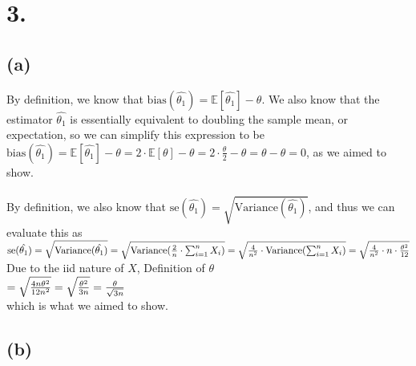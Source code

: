 \documentclass{article}
\begin{document}
\section*{3.}
{\Large

\subsection*{(a)}

By definition, we know that $\text{bias}(\hat{\theta_1}) = \mathbb{E}[\hat{\theta_1}] - \theta$. We also know that the estimator $\hat{\theta_1}$ is essentially equivalent to doubling the sample mean, or expectation, so we can simplify this expression to be \\
$\text{bias}(\hat{\theta_1}) = \mathbb{E}[\hat{\theta_1}] - \theta = 2 \cdot \mathbb{E}[\theta] - \theta = 2 \cdot \frac{\theta}{2} - \theta = \theta - \theta = 0$, as we aimed to show. \\ \\
By definition, we also know that $\text{se}(\hat{\theta_1}) = \sqrt{\text{Variance}(\hat{\theta_1})}$, and thus we can evaluate this as \\ 
$\text{se}(\hat{\theta_1}) = \sqrt{\text{Variance}(\hat{\theta_1})} \\
= \sqrt{\text{Variance}(\frac{2}{n} \cdot \sum_{i=1}^{n} X_i)} \\
= \sqrt{\frac{4}{n^2} \cdot \text{Variance}(\sum_{i=1}^{n} X_i)} \\
= \sqrt{\frac{4}{n^2} \cdot n \cdot \frac{\theta^2}{12}} $ \hfill Due to the iid nature of $X$, Definition of $\theta$ \\ 
$= \sqrt{\frac{4n\theta^2}{12n^2}} \\
= \sqrt{\frac{\theta^2}{3n}} \\
= \frac{\theta}{\sqrt{3n}}$ \\
which is what we aimed to show.

\subsection*{(b)}

}
\end{document}
